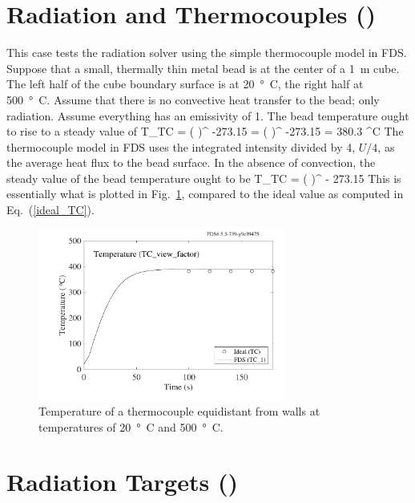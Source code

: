 \documentclass[11pt]{book}
\begin{document}
\section{Radiation and Thermocouples (\texorpdfstring{}{TC\_view\_factor}) }
\label{TC_view_factor}

This case tests the radiation solver using the simple thermocouple model in FDS.
Suppose that a small, thermally thin metal bead is at the center of a 1~m cube. The left half of the cube boundary surface is
at 20~\si{\degree C}, the right half at 500~\si{\degree C}. Assume that there is no convective heat transfer to the bead; only radiation. Assume everything has an emissivity of 1. The
bead temperature ought to rise to a steady value of
\be
   T_{\hbox{\tiny TC}} = \left(  \right)^ -273.15 = \left(  \right)^ -273.15 = 380.3 \quad ^\circ \hbox{C}
   \label{ideal_TC}
\ee
The thermocouple model in FDS uses the integrated intensity divided by 4, $U/4$, as the average heat flux to the bead surface. In the absence of convection, the steady value of the bead temperature ought to be
\be
   T_{\hbox{\tiny TC}} = \left(  \right)^ - 273.15
\ee
This is essentially what is plotted in Fig.~\ref{TC_view_factor_plot}, compared to the ideal value as computed in Eq.~(\ref{ideal_TC}).
\noindent
\begin{figure}[h]
\begin{center}
\includegraphics[width=3.2in]{SCRIPT_FIGURES/TC_view_factor}
\end{center}
\caption[Radiation/thermocouple test case]{Temperature of a thermocouple equidistant from walls at temperatures of 20~\si{\degree C} and 500~\si{\degree C}.}
\label{TC_view_factor_plot}
\end{figure}

\clearpage

\section{Radiation Targets (\texorpdfstring{}{target\_test}) }
\label{target_test}
\end{document}
